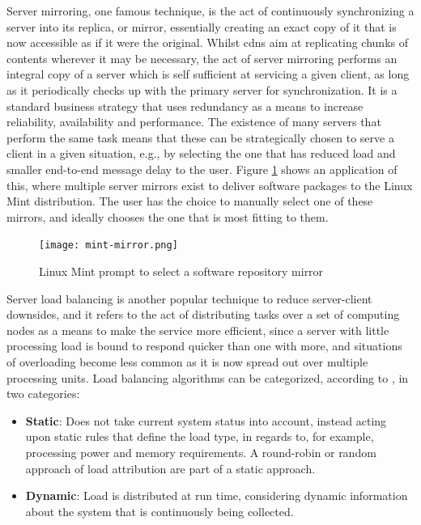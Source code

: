     Server mirroring, one famous technique, is the act of continuously synchronizing a server into its replica, or mirror, essentially creating an exact copy of it that is now accessible as if it were the original.
    Whilst \glspl{cdn} aim at replicating chunks of contents wherever it may be necessary, the act of server mirroring performs an integral copy of a server which is self sufficient at servicing a given client, as long as it periodically checks up with the primary server for synchronization.
   It is a standard business strategy that uses redundancy as a means to increase reliability, availability and performance.
   The existence of many servers that perform the same task means that these can be strategically chosen to serve a client in a given situation, e.g., by selecting the one that has reduced load and smaller end-to-end message delay to the user.
   Figure \ref{fig:mint-mirrors} shows an application of this, where multiple server mirrors exist to deliver software packages to the Linux Mint \cite{linux-mint} distribution.
   The user has the choice to manually select one of these mirrors, and ideally chooses the one that is most fitting to them.

    \begin{figure}[H]
    \centering
    \texttt{[image: mint-mirror.png]}
    \caption{Linux Mint prompt to select a software repository mirror}
    \label{fig:mint-mirrors}
    \end{figure}

    Server load balancing is another popular technique to reduce server-client downsides, and it refers to the act of distributing tasks over a set of computing nodes as a means to make the service more efficient, since a server with little processing load is bound to respond quicker than one with more, and situations of overloading become less common as it is now spread out over multiple processing units.
    Load balancing algorithms can be categorized, according to \cite{load-balancing}, in two categories:

    \begin{itemize}
        \item \textbf{Static}: Does not take current system status into account, instead acting upon static rules that define the load type, in regards to, for example, processing power and memory requirements.
            A round-robin or random approach of load attribution are part of a static approach.
        \item \textbf{Dynamic}: Load is distributed at run time, considering dynamic information about the system that is continuously being collected.
    \end{itemize}

